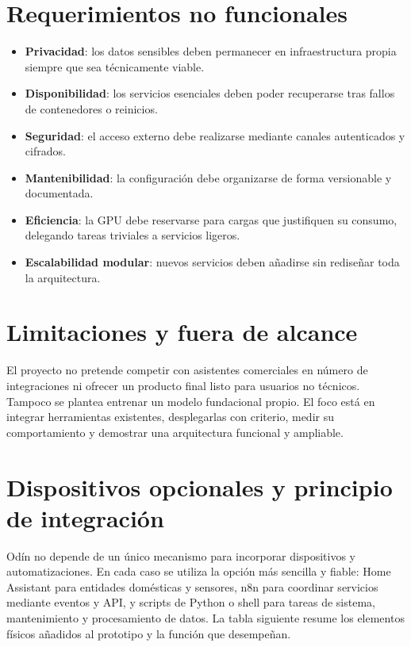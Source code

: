 \section{Requerimientos no funcionales}
\begin{itemize}
  \item \textbf{Privacidad}: los datos sensibles deben permanecer en infraestructura propia siempre que sea técnicamente viable.
  \item \textbf{Disponibilidad}: los servicios esenciales deben poder recuperarse tras fallos de contenedores o reinicios.
  \item \textbf{Seguridad}: el acceso externo debe realizarse mediante canales autenticados y cifrados.
  \item \textbf{Mantenibilidad}: la configuración debe organizarse de forma versionable y documentada.
  \item \textbf{Eficiencia}: la GPU debe reservarse para cargas que justifiquen su consumo, delegando tareas triviales a servicios ligeros.
  \item \textbf{Escalabilidad modular}: nuevos servicios deben añadirse sin rediseñar toda la arquitectura.
\end{itemize}

\section{Limitaciones y fuera de alcance}
El proyecto no pretende competir con asistentes comerciales en número de integraciones ni ofrecer un producto final listo para usuarios no técnicos. Tampoco se plantea entrenar un modelo fundacional propio. El foco está en integrar herramientas existentes, desplegarlas con criterio, medir su comportamiento y demostrar una arquitectura funcional y ampliable.

\section{Dispositivos opcionales y principio de integración}
Odín no depende de un único mecanismo para incorporar dispositivos y automatizaciones. En cada caso se utiliza la opción más sencilla y fiable: Home Assistant para entidades domésticas y sensores, n8n para coordinar servicios mediante eventos y API, y scripts de Python o shell para tareas de sistema, mantenimiento y procesamiento de datos. La tabla siguiente resume los elementos físicos añadidos al prototipo y la función que desempeñan.

